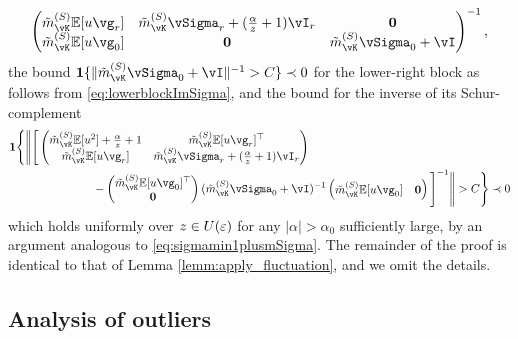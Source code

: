 \begin{proof-of-lemma}[\ref{lemm:apply_fluctuation2}]
\[\begin{pmatrix}
\tilde m_{\vK}^{(S)} \E[u\vg_r] &
\tilde m_{\vK}^{(S)}\vSigma_r
+(\frac{\alpha}{z}+1)\vI_r & \mathbf{0} \\
	\tilde m_{\vK}^{(S)} \E[u\vg_0] & \mathbf{0} &
\tilde m_{\vK}^{(S)}\vSigma_0+\vI
\end{pmatrix}^{-1},\]
the bound $\bI\{\|\tilde m_{\vK}^{(S)}\vSigma_0+\vI\|^{-1}>C\} \prec 0$ for
the lower-right block as follows from
\eqref{eq:lowerblockImSigma}, and the bound for the inverse of
its Schur-complement
\begin{align*}
&\bI\Bigg\{\Bigg\|\Bigg[\begin{pmatrix}
 \tilde m_{\vK}^{(S)}\E[u^2]
+\frac{\alpha}{z}+1 & \tilde m_{\vK}^{(S)}\E[u\vg_r]^\top \\
\tilde m_{\vK}^{(S)}\E[u\vg_r] & \tilde m_{\vK}^{(S)}\vSigma_r
+(\frac{\alpha}{z}+1)\vI_r \end{pmatrix}\\
&\hspace{1in}
-\begin{pmatrix} \tilde m_{\vK}^{(S)}\E[u\vg_0]^\top \\ \mathbf{0} \end{pmatrix}
(\tilde m_{\vK}^{(S)}\vSigma_0+\vI)^{-1}
\begin{pmatrix} \tilde m_{\vK}^{(S)}\E[u\vg_0] & \mathbf{0}
\end{pmatrix}\Bigg]^{-1}
\Bigg\|>C\Bigg\} \prec 0
\end{align*}
which holds uniformly over $z \in U(\varepsilon)$ for any $|\alpha|>\alpha_0$ 
sufficiently large, by an argument analogous to \eqref{eq:sigmamin1plusmSigma}.
The remainder of the proof
is identical to that of Lemma \ref{lemm:apply_fluctuation}, and we omit the
details. 
\end{proof-of-lemma}

\subsection{Analysis of outliers}

